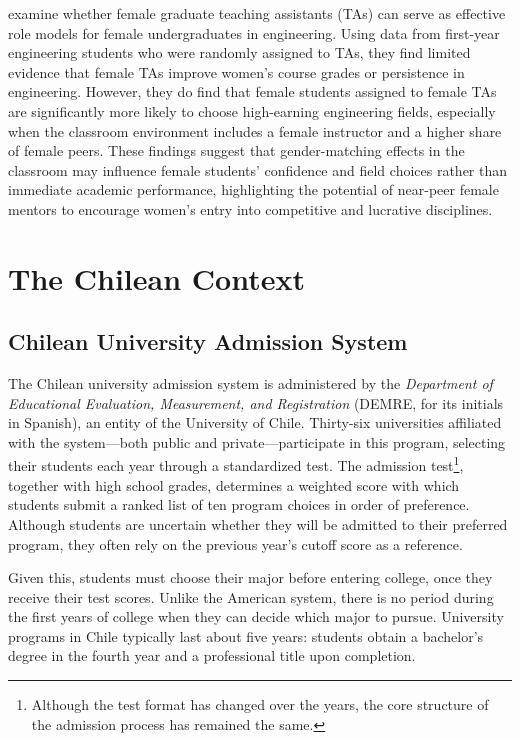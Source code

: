  \citet{griffith_role_2021} examine whether female graduate teaching assistants (TAs) can serve as effective role models for female undergraduates in engineering. Using data from first-year engineering students who were randomly assigned to TAs, they find limited evidence that female TAs improve women’s course grades or persistence in engineering. However, they do find that female students assigned to female TAs are significantly more likely to choose high-earning engineering fields, especially when the classroom environment includes a female instructor and a higher share of female peers. These findings suggest that gender-matching effects in the classroom may influence female students’ confidence and field choices rather than immediate academic performance, highlighting the potential of near-peer female mentors to encourage women’s entry into competitive and lucrative disciplines.
 
 \section{ The Chilean Context}
 
 \subsection{ Chilean University Admission System}
The Chilean university admission system is administered by the \textit{Department of Educational Evaluation, Measurement, and Registration} (DEMRE, for its initials in Spanish), an entity of the University of Chile. Thirty-six universities affiliated with the system—both public and private—participate in this program, selecting their students each year through a standardized test. The admission test\footnote{Although the test format has changed over the years, the core structure of the admission process has remained the same.}, together with high school grades, determines a weighted score with which students submit a ranked list of ten program choices in order of preference. Although students are uncertain whether they will be admitted to their preferred program, they often rely on the previous year's cutoff score as a reference.

Given this, students must choose their major before entering college, once they receive their test scores. Unlike the American system, there is no period during the first years of college when they can decide which major to pursue. University programs in Chile typically last about five years: students obtain a bachelor’s degree in the fourth year and a professional title upon completion.

